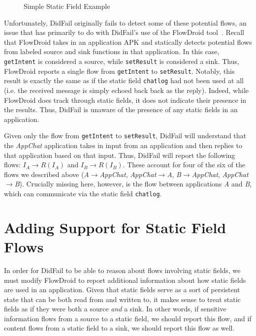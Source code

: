 \begin{figure}
\begin{framed}

\caption{Simple Static Field Example}
\label{fig:appchat}
\end{framed}
\end{figure}

Unfortunately, DidFail originally fails to detect some of these potential flows, an issue that has primarily to do with DidFail's use of the FlowDroid tool~\cite{flowdroid}. Recall that FlowDroid takes in an application APK and statically detects potential flows from labeled source and sink functions in that application. In this case, \texttt{getIntent} is considered a source, while \texttt{setResult} is considered a sink. Thus, FlowDroid reports a single flow from \texttt{getIntent} to \texttt{setResult}. Notably, this result is exactly the same as if the static field \texttt{chatlog} had not been used at all (i.e. the received message is simply echoed back back as the reply). Indeed, while FlowDroid does track through static fields, it does not indicate their presence in the results. Thus, DidFail is unaware of the presence of any static fields in an application.

Given only the flow from \texttt{getIntent} to \texttt{setResult}, DidFail will understand that the \emph{AppChat} application takes in input from an application and then replies to that application based on that input. Thus, DidFail will report the following flows: $I_A\rightarrow R(I_A)$ and $I_B\rightarrow R(I_B)$. These account for four of the six of the flows we described above (\emph{A$\rightarrow$AppChat}, \emph{AppChat$\rightarrow$A}, \emph{B$\rightarrow$AppChat}, \emph{AppChat$\rightarrow$B}). Crucially missing here, however, is the flow between applications \emph{A} and \emph{B}, which can communicate via the static field \texttt{chatlog}. 

\section{Adding Support for Static Field Flows}

In order for DidFail to be able to reason about flows involving static fields, we must modify FlowDroid to report additional information about how static fields are used in an application. Given that static fields serve as a sort of persistent state that can be both read from and written to, it makes sense to treat static fields as if they were both a source \emph{and} a sink. In other words, if sensitive information flows from a source to a static field, we should report this flow, and if content flows from a static field to a sink, we should report this flow as well.

